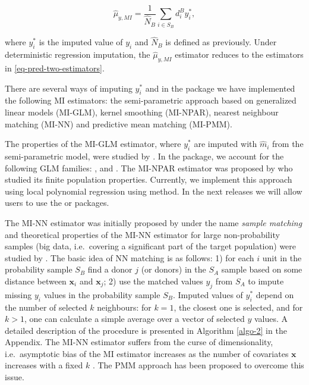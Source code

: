 \documentclass[
]{jss}
\begin{document}
\begin{equation}
\hat{\mu}_{y,MI}=\frac{1}{\hat{N}_{B}} \sum_{i \in S_{B}} d_i^{B} y_i^*, 
\end{equation}

where \(y_i^*\) is the imputed value of \(y_i\) and \(\hat{N}_{B}\) is
defined as previously. Under deterministic regression imputation, the
\(\hat{\mu}_{y,MI}\) estimator reduces to the estimators in
\eqref{eq-pred-two-estimators}.

There are several ways of imputing \(y_i^*\) and in the package we have
implemented the following MI estimators: the semi-parametric approach
based on generalized linear models (MI-GLM), kernel smoothing (MI-NPAR),
nearest neighbour matching (MI-NN) and predictive mean matching
(MI-PMM).

The properties of the MI-GLM estimator, where \(y_i^*\) are imputed with
\(\hat{m}_i\) from the semi-parametric model, were studied by
\citet{kim_combining_2021}. In the  package, we account
for the following GLM families: ,  and
. The MI-NPAR estimator was proposed by
\citet{chen_nonparametric_2022} who studied its finite population
properties. Currently, we implement this approach using local polynomial
regression using  method. In the next releases we
will allow users to use the  \citep{nppkg} or 
\citep{KernSmooth} packages.

The MI-NN estimator was initially proposed by \citet{rivers2007sampling}
under the name \textit{sample matching} and theoretical properties of
the MI-NN estimator for large non-probability samples (big data,
i.e.~covering a significant part of the target population) were studied
by \citet{yang2021integration}. The basic idea of NN matching is as
follows: 1) for each \(i\) unit in the probability sample \(S_B\) find a
donor \(j\) (or donors) in the \(S_A\) sample based on some distance
between \(\boldsymbol{x}_i\) and \(\boldsymbol{x}_j\); 2) use the
matched values \(y_j\) from \(S_A\) to impute missing \(y_i\) values in
the probability sample \(S_B\). Imputed values of \(y_i^*\) depend on
the number of selected \(k\) neighbours: for \(k=1\), the closest one is
selected, and for \(k>1\), one can calculate a simple average over a
vector of selected \(y\) values. A detailed description of the procedure
is presented in Algorithm \ref{algo-2} in the Appendix. The MI-NN
estimator suffers from the curse of dimensionality, i.e.~asymptotic bias
of the MI estimator increases as the number of covariates
\(\boldsymbol{x}\) increases with a fixed \(k\)
\citep{abadie2006large, yang_asymptotic_2020}. The PMM approach has been
proposed to overcome this issue.
\end{document}
